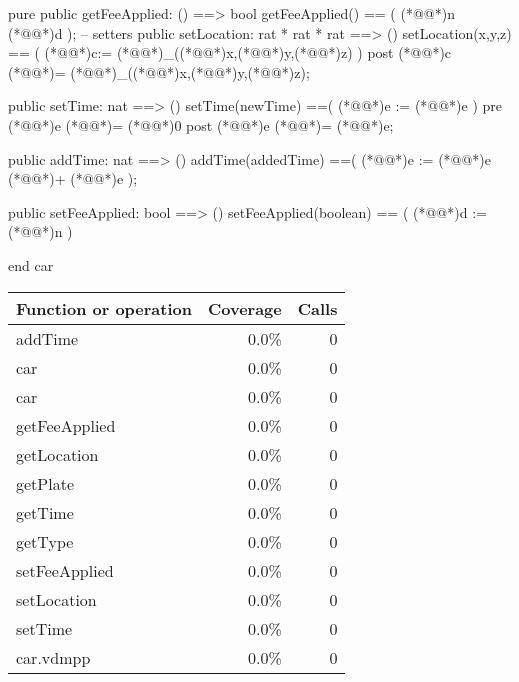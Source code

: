 \documentclass[a4paper]{article}
\begin{document}
\begin{vdm_al}
pure public getFeeApplied: () ==> bool
getFeeApplied() == (
(*@@*)n (*@@*)d
);
-- setters
public setLocation: rat * rat * rat ==> ()
setLocation(x,y,z) == (
    (*@@*)c:= (*@@*)_((*@\vdmnotcovered{}@*)x,(*@\vdmnotcovered{}@*)y,(*@\vdmnotcovered{}@*)z)
)
post (*@@*)c (*@\vdmnotcovered{}@*)= (*@@*)_((*@\vdmnotcovered{}@*)x,(*@\vdmnotcovered{}@*)y,(*@\vdmnotcovered{}@*)z);

public setTime: nat ==> ()
setTime(newTime) ==(
(*@@*)e := (*@@*)e
)
pre (*@@*)e (*@\vdmnotcovered{>}@*)= (*@\vdmnotcovered{}@*)0
post (*@@*)e (*@\vdmnotcovered{}@*)= (*@@*)e;

public addTime: nat ==> ()
addTime(addedTime) ==(
(*@@*)e := (*@@*)e (*@\vdmnotcovered{}@*)+ (*@@*)e
);

public setFeeApplied: bool ==> ()
setFeeApplied(boolean) == (
    (*@@*)d := (*@@*)n
)

end car
\end{vdm_al}
\bigskip
\begin{longtable}{|l|r|r|}
\hline
Function or operation & Coverage & Calls \\
\hline
\hline
addTime & 0.0\% & 0 \\
\hline
car & 0.0\% & 0 \\
\hline
car & 0.0\% & 0 \\
\hline
getFeeApplied & 0.0\% & 0 \\
\hline
getLocation & 0.0\% & 0 \\
\hline
getPlate & 0.0\% & 0 \\
\hline
getTime & 0.0\% & 0 \\
\hline
getType & 0.0\% & 0 \\
\hline
setFeeApplied & 0.0\% & 0 \\
\hline
setLocation & 0.0\% & 0 \\
\hline
setTime & 0.0\% & 0 \\
\hline
\hline
car.vdmpp & 0.0\% & 0 \\
\hline
\end{longtable}
\end{document}
